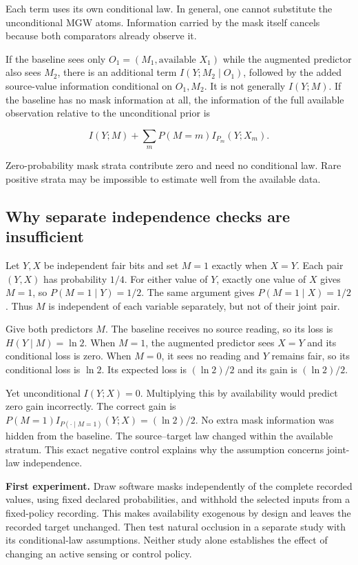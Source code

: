 \documentclass[11pt,a4paper]{article}
\begin{document}
Each term uses its own conditional law. In general, one cannot substitute the unconditional MGW atoms. Information carried by the mask itself cancels because both comparators already observe it.

If the baseline sees only \(O_1=(M_1,\text{available }X_1)\) while the augmented predictor also sees \(M_2\), there is an additional term \(I(Y;M_2\mid O_1)\), followed by the added source-value information conditional on \(O_1,M_2\). It is not generally \(I(Y;M)\). If the baseline has no mask information at all, the information of the full available observation relative to the unconditional prior is

\[
I(Y;M)+\sum_mP(M=m)I_{P_m}(Y;X_m).
\]

Zero-probability mask strata contribute zero and need no conditional law. Rare positive strata may be impossible to estimate well from the available data.

\par{}

\subsection{Why separate independence checks are insufficient}\label{why-separate-independence-checks-are-insufficient}

Let \(Y,X\) be independent fair bits and set \(M=1\) exactly when \(X=Y\). Each pair \((Y,X)\) has probability \(1/4\). For either value of \(Y\), exactly one value of \(X\) gives \(M=1\), so \(P(M=1\mid Y)=1/2\). The same argument gives \(P(M=1\mid X)=1/2\). Thus \(M\) is independent of each variable separately, but not of their joint pair.

Give both predictors \(M\). The baseline receives no source reading, so its loss is \(H(Y\mid M)=\ln2\). When \(M=1\), the augmented predictor sees \(X=Y\) and its conditional loss is zero. When \(M=0\), it sees no reading and \(Y\) remains fair, so its conditional loss is \(\ln2\). Its expected loss is \((\ln2)/2\) and its gain is \((\ln2)/2\).

Yet unconditional \(I(Y;X)=0\). Multiplying this by availability would predict zero gain incorrectly. The correct gain is \(P(M=1)I_{P(\cdot\mid M=1)}(Y;X)=(\ln2)/2\). No extra mask information was hidden from the baseline. The source--target law changed within the available stratum. This exact negative control explains why the assumption concerns joint-law independence.

\textbf{First experiment.} Draw software masks independently of the complete recorded values, using fixed declared probabilities, and withhold the selected inputs from a fixed-policy recording. This makes availability exogenous by design and leaves the recorded target unchanged. Then test natural occlusion in a separate study with its conditional-law assumptions. Neither study alone establishes the effect of changing an active sensing or control policy.
\end{document}
